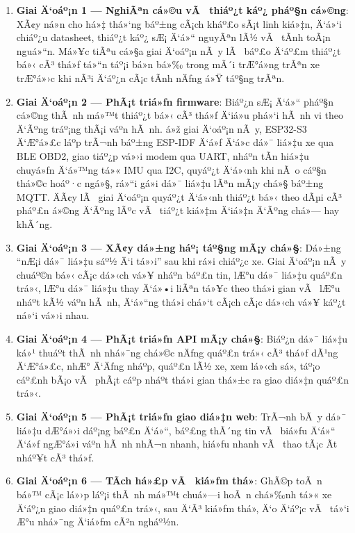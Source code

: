 \documentclass[a4paper]{extarticle}
\providecommand{\tightlist}{%
  \setlength{\itemsep}{0pt}\setlength{\parskip}{0pt}}
\begin{document}
\begin{enumerate}
\def\labelenumi{\arabic{enumi}.}
\tightlist
\item
  \textbf{Giai Ä‘oáº¡n 1 --- NghiÃªn cá»©u vÃ  thiáº¿t káº¿ pháº§n cá»©ng}: XÃ¢y ná»n cho
  há»‡ thá»‘ng báº±ng cÃ¡ch kháº£o sÃ¡t linh kiá»‡n, Ä‘á»‘i chiáº¿u datasheet, thiáº¿t káº¿
  sÆ¡ Ä‘á»“ nguyÃªn lÃ½ vÃ  tÃ­nh toÃ¡n nguá»“n. Má»¥c tiÃªu cá»§a giai Ä‘oáº¡n nÃ y lÃ  báº£o
  Ä‘áº£m thiáº¿t bá»‹ cÃ³ thá»ƒ tá»“n táº¡i bá»n bá»‰ trong mÃ´i trÆ°á»ng trÃªn xe trÆ°á»›c khi
  nÃ³i Ä‘áº¿n cÃ¡c tÃ­nh nÄƒng á»Ÿ táº§ng trÃªn.
\item
  \textbf{Giai Ä‘oáº¡n 2 --- PhÃ¡t triá»ƒn firmware}: Biáº¿n sÆ¡ Ä‘á»“ pháº§n cá»©ng
  thÃ nh má»™t thiáº¿t bá»‹ cÃ³ thá»ƒ Ä‘iá»u phá»‘i hÃ nh vi theo Ä‘Ãºng tráº¡ng thÃ¡i váº­n
  hÃ nh. á»ž giai Ä‘oáº¡n nÃ y, ESP32-S3 Ä‘Æ°á»£c láº­p trÃ¬nh báº±ng ESP-IDF Ä‘á»ƒ Ä‘á»c dá»¯
  liá»‡u xe qua BLE OBD2, giao tiáº¿p vá»›i modem qua UART, nháº­n tÃ­n hiá»‡u
  chuyá»ƒn Ä‘á»™ng tá»« IMU qua I2C, quyáº¿t Ä‘á»‹nh khi nÃ o cáº§n thá»©c hoáº·c ngá»§, rá»“i
  gá»­i dá»¯ liá»‡u lÃªn mÃ¡y chá»§ báº±ng MQTT. ÄÃ¢y lÃ  giai Ä‘oáº¡n quyáº¿t Ä‘á»‹nh thiáº¿t
  bá»‹ theo dÃµi cÃ³ pháº£n á»©ng Ä‘Ãºng lÃºc vÃ  tiáº¿t kiá»‡m Ä‘iá»‡n Ä‘Ãºng chá»— hay khÃ´ng.
\item
  \textbf{Giai Ä‘oáº¡n 3 --- XÃ¢y dá»±ng háº¡ táº§ng mÃ¡y chá»§}: Dá»±ng ``nÆ¡i dá»¯ liá»‡u
  sáº½ Ä‘i tá»›i'' sau khi rá»i chiáº¿c xe. Giai Ä‘oáº¡n nÃ y chuáº©n bá»‹ cÃ¡c dá»‹ch vá»¥
  nháº­n báº£n tin, lÆ°u dá»¯ liá»‡u quáº£n trá»‹, lÆ°u dá»¯ liá»‡u thay Ä‘á»•i liÃªn tá»¥c theo
  thá»i gian vÃ  lÆ°u nháº­t kÃ½ váº­n hÃ nh, Ä‘á»“ng thá»i chá»‘t cÃ¡ch cÃ¡c dá»‹ch vá»¥ káº¿t
  ná»‘i vá»›i nhau.
\item
  \textbf{Giai Ä‘oáº¡n 4 --- PhÃ¡t triá»ƒn API mÃ¡y chá»§}: Biáº¿n dá»¯ liá»‡u ká»¹ thuáº­t
  thÃ nh nhá»¯ng chá»©c nÄƒng quáº£n trá»‹ cÃ³ thá»ƒ dÃ¹ng Ä‘Æ°á»£c, nhÆ° Ä‘Äƒng nháº­p, quáº£n
  lÃ½ xe, xem lá»‹ch sá»­, táº¡o cáº£nh bÃ¡o vÃ  phÃ¡t cáº­p nháº­t thá»i gian thá»±c ra
  giao diá»‡n quáº£n trá»‹.
\item
  \textbf{Giai Ä‘oáº¡n 5 --- PhÃ¡t triá»ƒn giao diá»‡n web}: TrÃ¬nh bÃ y dá»¯ liá»‡u dÆ°á»›i
  dáº¡ng báº£n Ä‘á»“, báº£ng thÃ´ng tin vÃ  biá»ƒu Ä‘á»“ Ä‘á»ƒ ngÆ°á»i váº­n hÃ nh nhÃ¬n nhanh,
  hiá»ƒu nhanh vÃ  thao tÃ¡c Ã­t nháº¥t cÃ³ thá»ƒ.
\item
  \textbf{Giai Ä‘oáº¡n 6 --- TÃ­ch há»£p vÃ  kiá»ƒm thá»­}: GhÃ©p toÃ n bá»™ cÃ¡c lá»›p
  láº¡i thÃ nh má»™t chuá»—i hoÃ n chá»‰nh tá»« xe Ä‘áº¿n giao diá»‡n quáº£n trá»‹, sau Ä‘Ã³ kiá»ƒm thá»­,
  Ä‘o Ä‘áº¡c vÃ  tá»‘i Æ°u nhá»¯ng Ä‘iá»ƒm cÃ²n ngháº½n.
\end{enumerate}
\end{document}
